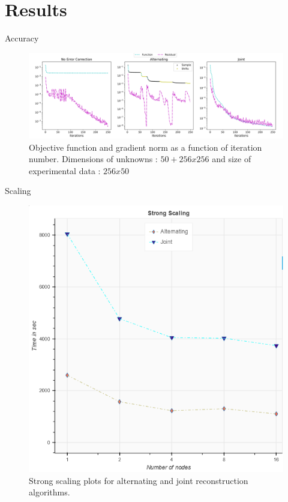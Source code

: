 \documentclass{beamer}
\begin{document}
\section{Results}
\begin{frame}{Accuracy}
	\begin{center}
		\begin{figure}
			\hspace*{-0.5cm}\includegraphics[scale=0.275]{figures/func_resd.pdf}
			\caption{Objective function and gradient norm as a function of iteration number. Dimensions of unknowns : $50+256x256$ and size of experimental data : $256x50$}
		\end{figure}
	\end{center}
\end{frame}
\begin{frame}{Scaling}
	\begin{center}
		\begin{figure}
			\hspace*{-1.5cm}\includegraphics[scale=0.25]{figures/strscale.png}
			\caption{Strong scaling plots for alternating and joint reconstruction algorithms.}
		\end{figure}
	\end{center}
\end{frame}
\end{document}
